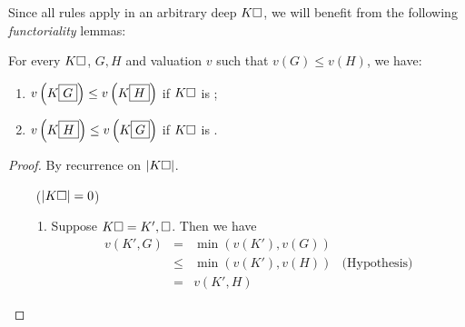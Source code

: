 \begin{scope}
\begin{scope}
Since all rules apply in an arbitrary deep  $K\square$, we will benefit
from the following \emph{functoriality} lemmas:


\begin{lemma}[Variance]
  
  For every  $K\square$,  $G, H$ and valuation $v$ such that $v(G)
  \leq v(H)$, we have:
  \begin{enumerate}
    \item $v\left(K\fbox{$G$}\right) \leq v\left(K\fbox{$H$}\right)$ if $K\square$
    is ;
    \item $v\left(K\fbox{$H$}\right) \leq v\left(K\fbox{$G$}\right)$ if $K\square$
    is .
  \end{enumerate}
\end{lemma}
\begin{proof}
  By recurrence on $\left|K\square\right|$.

  \def\arraystretch{1.5}
  \begin{itemize}
    \item[\bcase~($\left|K\square\right| = 0$)]\sbr
      \begin{enumerate}
        \item Suppose $K\square = K', \square$. Then we have
        $$
        \begin{array}{rcll}
          v(K', G)
          &=& \min(v(K'), v(G)) & \\
          &\leq& \min(v(K'), v(H)) &\text{(Hypothesis)} \\
          &=& v(K', H) &
        \end{array}
        $$


\end{enumerate}
\end{itemize}
\end{proof}
\end{scope}
\end{scope}

